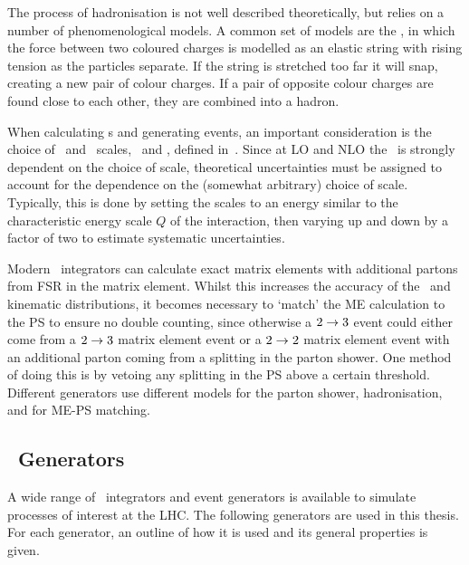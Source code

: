 The process of hadronisation is not well described theoretically,
but relies on a number of phenomenological models. A common set of models are
the , in which the
force between two coloured charges is modelled as an elastic string with
rising tension as the particles separate. If the string is stretched too far
it will snap, creating a new pair of colour charges. If a pair of opposite
colour charges are found close to each other, they are combined into a hadron.

When calculating \cx s and generating events, an important consideration is the
choice of \fact\ and \renorm\ scales, \uR\ and \uF, defined in~. Since at
LO and NLO the \cx\ is strongly dependent on the choice of scale,
theoretical uncertainties must be assigned to account for the dependence on the
(somewhat arbitrary) choice of scale. Typically, this is done by setting the
scales to an energy similar to the characteristic energy scale $Q$ of the interaction, then
varying up and down by a factor of two to estimate systematic uncertainties.


Modern \mc\ integrators can calculate exact matrix elements with additional
partons from FSR in the matrix element. Whilst this increases the accuracy of
the \cx\ and kinematic distributions, it becomes necessary to `match' the
ME calculation to the PS to ensure no double counting, since otherwise a
$2\rightarrow3$ event could either come from a $2\rightarrow3$ matrix element event or a $2\rightarrow2$
matrix element event with an additional parton coming from a splitting in the
parton shower. One method of doing this is by vetoing any splitting in the PS above a
certain threshold. Different generators use different models for the parton
shower, hadronisation, and for ME-PS matching.

\subsection{\mc\ Generators}
\label{sec:Theory-MC-gen}

A wide range of \mc\ integrators and event generators is available to simulate
processes of interest at the LHC. The
following generators are used in this thesis. For each generator, an outline of
how it is used and its general properties is given.

